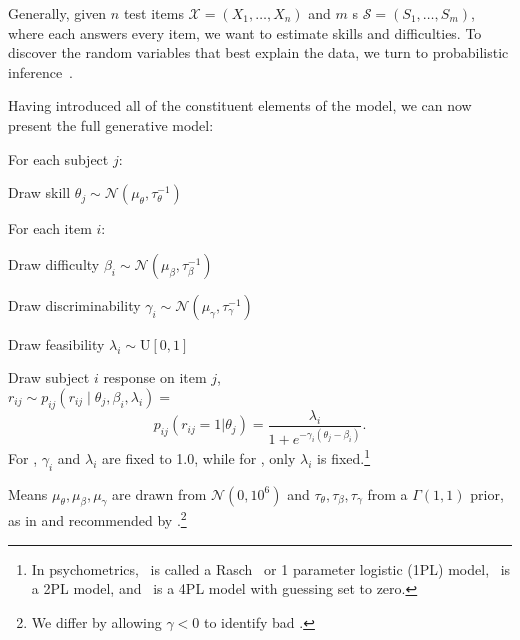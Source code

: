 Generally, given $n$ test items $\mathcal{X}=(X_1,\ldots,X_n)$
and $m$ \subj{}s
$\mathcal{S}=(S_1,\ldots,S_m)$, where each \subj{} answers every
item, we want to estimate \subj{} skills and \itm{} difficulties.
To discover the random variables that best explain the data, we
turn to probabilistic inference~\cite{pearl-88}.


Having introduced all of the constituent elements of the model, we can
now present the full generative model:
\begin{enumerate*}
  \item For each subject $j$:
  \begin{enumerate*}
    \item Draw skill $\theta_j \sim \mathcal{N}(\mu_\theta, \tau_\theta^{-1})$
  \end{enumerate*}
  \item For each item $i$:
  \begin{enumerate*}
    \item Draw difficulty $\beta_i \sim\mathcal{N}(\mu_\beta, \tau_\beta^{-1})$
    \item Draw discriminability $\gamma_i \sim \mathcal{N}(\mu_\gamma, \tau_\gamma^{-1})$
    \item Draw feasibility $\lambda_i \sim \text{U}[0,1]$
  \end{enumerate*}
  \item Draw subject $i$ response on item $j$,\\$r_{ij} \sim p_{ij}(r_{ij} \mid \theta_j, \beta_i, \lambda_i )=$
    \begin{equation}
      p_{ij}(r_{ij}=1|\theta_j)=\frac{\lambda_i}{1+e^{-\gamma_i(\theta_j-\beta_i)}}.
      \label{eq:isicle:ours}
    \end{equation}
    For , $\gamma_i$ and $\lambda_i$ are fixed to 1.0, while for
    , only $\lambda_i$ is fixed.\footnote{In psychometrics, ~is called a Rasch~\citep{rasch1960studies} or 1 parameter logistic (1PL) model, ~is a 2PL model, and ~is a 4PL model with guessing set to zero.}
\end{enumerate*}
Means $\mu_\theta,\mu_\beta,\mu_\gamma$ are drawn from
$\mathcal{N}(0,10^6)$ and $\tau_\theta,\tau_\beta,\tau_\gamma$
from a $\Gamma(1,1)$ prior, as in \citet{lalor2019latent} and
recommended by \citet{natesan2016birt}.\footnote{We differ by
  allowing $\gamma<0$ to identify bad \itms{}.  }

